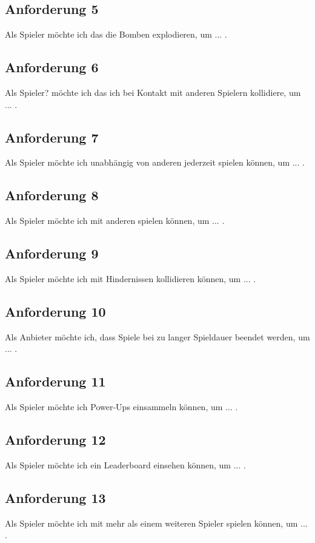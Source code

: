 \documentclass[conference]{IEEEtran}
\begin{document}
\subsection{Anforderung 5}
Als Spieler möchte ich das die Bomben explodieren, um ... .

\subsection{Anforderung 6}

Als Spieler? möchte ich das ich bei Kontakt mit anderen Spielern kollidiere, um ... .

\subsection{Anforderung 7}

Als Spieler möchte ich unabhängig von anderen jederzeit spielen können, um ... .

\subsection{Anforderung 8}
Als Spieler möchte ich mit anderen spielen können, um ... .

\subsection{Anforderung 9}
Als Spieler möchte ich mit Hindernissen kollidieren können, um ... .

\subsection{Anforderung 10}
Als Anbieter möchte ich, dass Spiele bei zu langer Spieldauer beendet werden, um ... .

\subsection{Anforderung 11}
Als Spieler möchte ich Power-Ups einsammeln können, um ... .

\subsection{Anforderung 12}
Als Spieler möchte ich ein Leaderboard einsehen können, um ... .

\subsection{Anforderung 13}
Als Spieler möchte ich mit mehr als einem weiteren Spieler spielen können, um ... .
\end{document}
